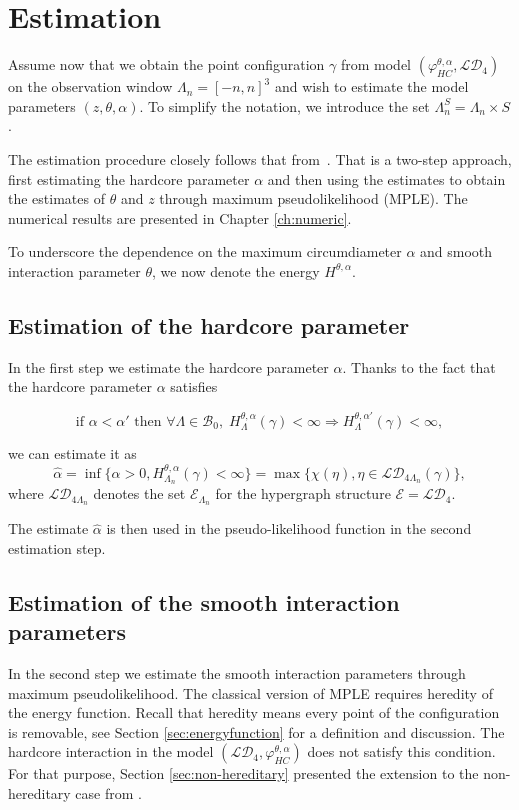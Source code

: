 \chapter{Estimation}\label{ch:estimation}
Assume now that we obtain the point configuration $\gamma$ from model $(\varphi^{\theta,\alpha}_{HC},\mathcal {LD}_4)$ on the observation window $\Lambda_n = [-n,n]^3$ and wish to estimate the model parameters $(z,\theta,\alpha)$. To simplify the notation, we introduce the set $\Lambda^S_n = \Lambda_n \times S$.

The estimation procedure closely follows that from~\cite{DereudreLavancier2011}. That is a two-step approach, first estimating the hardcore parameter $\alpha$ and then using the estimates to obtain the estimates of $\theta$ and $z$ through maximum pseudolikelihood (MPLE). The numerical results are presented in Chapter \ref{ch:numeric}.

To underscore the dependence on the maximum circumdiameter $\alpha$ and smooth interaction parameter $\theta$, we now denote the energy $H^{\theta,\alpha}$.
\section{Estimation of the hardcore parameter}
In the first step we estimate the hardcore parameter $\alpha$. 
 Thanks to the fact that the hardcore parameter $\alpha$ satisfies

 $$ \text{if } \alpha < \alpha' \text{ then  } \forall \Lambda \in \mathcal B_0, \; H^{\theta,\alpha}_\Lambda(\gamma) < \infty \Rightarrow  H^{\theta,\alpha'}_\Lambda(\gamma)<\infty,$$ 

we can estimate it as
$$\hat\alpha = \inf\{\alpha > 0, H^{\theta,\alpha}_{\Lambda_n}(\gamma) < \infty \} = \max\{\chi(\eta), \eta\in \mathcal {LD}_{4\Lambda_n}(\gamma)\},$$
where $\mathcal {LD}_{4\Lambda_n}$ denotes the set $\mathcal E_{\Lambda_n}$ for the hypergraph structure $\mathcal E = \mathcal {LD}_4$.

The estimate $\hat\alpha$ is then used in the pseudo-likelihood function in the second estimation step.


\section{Estimation of the smooth interaction parameters}
In the second step we estimate the smooth interaction parameters through maximum pseudolikelihood.
The classical version of MPLE requires heredity of the energy function. Recall that heredity means every point of the configuration is removable, see Section \ref{sec:energyfunction} for a definition and discussion. The hardcore interaction in the model $(\mathcal {LD}_4,\varphi^{\theta,\alpha}_{HC})$ does not satisfy this condition. For that purpose, Section \ref{sec:non-hereditary} presented the extension to the non-hereditary case from \cite{DereudreLavancier2009}. 


